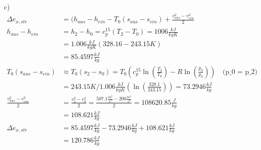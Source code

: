 c)
\begin{align*}
\Delta e_{x,str} &= (h_{aus} - h_{ein} - T_0 (s_{aus} - s_{ein}) + \frac{v_{aus}^2 - v_{ein}^2}{2} \\
h_{aus} - h_{ein} &= h_2 - h_0 = c_p^{15} (T_2 - T_0) = 1006 \frac{kJ}{kgK} \\
&= 1.006 \frac{kJ}{kgK} (328.16 - 243.15 K) \\
&= 85.4597 \frac{kJ}{kg} \\
T_0 (s_{aus} - s_{ein}) &\approx T_0 (s_2 - s_0) = T_0 \left( c_p^{15} \ln \left( \frac{T_2}{T_0} \right) - R \ln \left( \frac{p_0}{p_0} \right) \right) \quad \text{(p_0 = p_2)} \\
&= 243.15 K / 1.006 \frac{kJ}{kgK} \left( \ln \left( \frac{328.1}{243.15} \right) \right) = 73.2946 \frac{kJ}{kg} \\
\frac{v_{aus}^2 - v_{ein}^2}{2} &= \frac{v_2^2 - v_0^2}{2} = \frac{507.1 \frac{m^2}{s^2} - 200 \frac{m^2}{s^2}}{2} = 108620.85 \frac{J}{kg} \\
&= 108.621 \frac{kJ}{kg} \\
\Delta e_{x,str} &= 85.4597 \frac{kJ}{kg} - 73.2946 \frac{kJ}{kg} + 108.621 \frac{kJ}{kg} \\
&= 120.786 \frac{kJ}{kg}
\end{align*}
